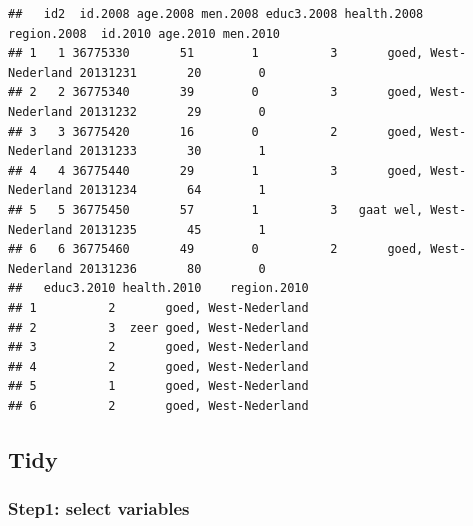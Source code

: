 \documentclass[
]{book}
\newenvironment{Shaded}{\begin{snugshade}}{\end{snugshade}}
\newcommand{\CommentTok}[1]{\textcolor[rgb]{0.56,0.35,0.01}{\textit{#1}}}
\newcommand{\KeywordTok}[1]{\textcolor[rgb]{0.13,0.29,0.53}{\textbf{#1}}}
\newcommand{\NormalTok}[1]{#1}
\newcommand{\OperatorTok}[1]{\textcolor[rgb]{0.81,0.36,0.00}{\textbf{#1}}}
\newcommand{\StringTok}[1]{\textcolor[rgb]{0.31,0.60,0.02}{#1}}
\begin{document}
\begin{verbatim}
##   id2  id.2008 age.2008 men.2008 educ3.2008 health.2008    region.2008  id.2010 age.2010 men.2010
## 1   1 36775330       51        1          3       goed, West-Nederland 20131231       20        0
## 2   2 36775340       39        0          3       goed, West-Nederland 20131232       29        0
## 3   3 36775420       16        0          2       goed, West-Nederland 20131233       30        1
## 4   4 36775440       29        1          3       goed, West-Nederland 20131234       64        1
## 5   5 36775450       57        1          3   gaat wel, West-Nederland 20131235       45        1
## 6   6 36775460       49        0          2       goed, West-Nederland 20131236       80        0
##   educ3.2010 health.2010    region.2010
## 1          2       goed, West-Nederland
## 2          3  zeer goed, West-Nederland
## 3          2       goed, West-Nederland
## 4          2       goed, West-Nederland
## 5          1       goed, West-Nederland
## 6          2       goed, West-Nederland
\end{verbatim}

\hypertarget{tidy-3}{%
\subsection{Tidy}\label{tidy-3}}

\hypertarget{step1-select-variables-1}{%
\subsubsection{Step1: select variables}\label{step1-select-variables-1}}

\begin{Shaded}
\end{Shaded}
\end{document}
